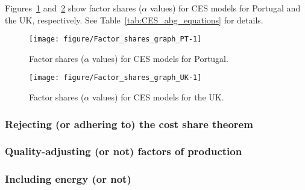 \documentclass[preprint,authoryear,12pt]{elsarticle}\usepackage[]{graphicx}\usepackage[]{color}
\makeatletter
\def\maxwidth{ %
  \ifdim\Gin@nat@width>\linewidth
    \linewidth
  \else
    \Gin@nat@width
  \fi
}
\newenvironment{knitrout}{}{} %
\makeatother
\begin{document}
Figures~\ref{fig:Factor_shares_graph_PT} and~\ref{fig:Factor_shares_graph_UK}
show factor shares ($\alpha$ values) for CES models for
Portugal and the UK, respectively.
See Table~\ref{tab:CES_abg_equations} for details.



\begin{knitrout}
\color{fgcolor}\begin{figure}[H]

{\centering \texttt{[image: figure/Factor\_shares\_graph\_PT-1]} 

}

\caption[Factor shares (]{Factor shares ($\alpha$ values) for CES models for Portugal.}\label{fig:Factor_shares_graph_PT}
\end{figure}


\end{knitrout}

\begin{knitrout}
\color{fgcolor}\begin{figure}[H]

{\centering \texttt{[image: figure/Factor\_shares\_graph\_UK-1]} 

}

\caption[Factor shares (]{Factor shares ($\alpha$ values) for CES models for the UK.}\label{fig:Factor_shares_graph_UK}
\end{figure}


\end{knitrout}


\subsubsection{Rejecting (or adhering to) the cost share theorem} 
\label{sec:fs_cst}


\subsubsection{Quality-adjusting (or not) factors of production} 
\label{sec:fs_fop}


\subsubsection{Including energy (or not)} 
\label{sec:fs_energy}
\end{document}
